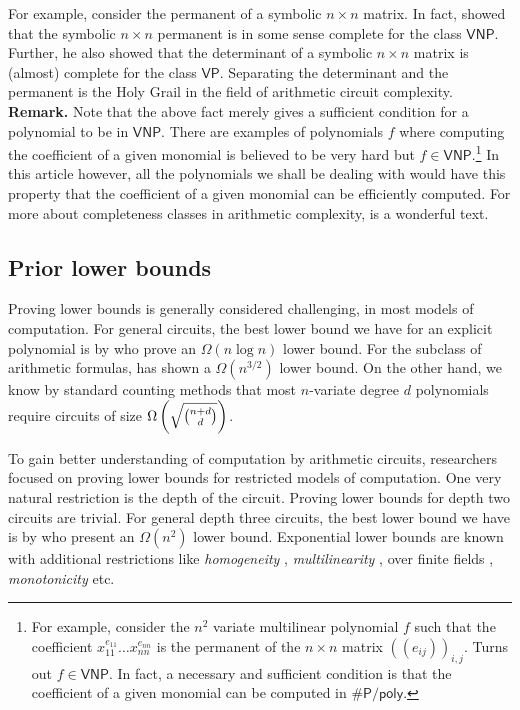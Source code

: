 \documentclass[12pt]{report}
\newcommand{\poly}{\mathsf{poly}}
\newcommand{\VP}{\mathsf{VP}}
\newcommand{\VNP}{\mathsf{VNP}}
\begin{document}
For example, consider the permanent of a symbolic $n\times n$ matrix. In fact, \cite{v79} showed that the symbolic $n\times n$ permanent is in some sense complete for the class $\VNP$. Further, he also showed that the determinant of a symbolic  $n\times n$ matrix is (almost) complete for the class $\VP$. Separating the determinant and the permanent is the Holy Grail in the field of arithmetic circuit complexity. \\

{\bf Remark.} Note that the above fact merely gives a sufficient condition for a polynomial to be in $\VNP$. There are examples of polynomials $f$ where computing the coefficient of a given monomial is believed to be very hard but $f\in \VNP$.\footnote{For example, consider the $n^2$ variate multilinear polynomial $f$ such that the coefficient $x_{11}^{e_{11}}\dots x_{nn}^{e_{nn}}$ is the permanent of the $n\times n$ matrix $(\!(e_{ij})\!)_{i,j}$. Turns out $f \in \VNP$. In fact, a necessary and sufficient condition is that the coefficient of a given monomial can be computed in $\#\mathsf{P}/\poly$. }  In this article however, all the polynomials we shall be dealing with would have this property that the coefficient of a given monomial can be efficiently computed. For more about completeness classes in arithmetic complexity, \cite{bcs97} is a wonderful text. 


\subsection{Prior lower bounds}

Proving lower bounds is generally considered challenging, in most models of computation. For general circuits, the best lower bound we have for an explicit polynomial is by \cite{BS83} who prove an $\Omega(n\log n)$ lower bound. For the subclass of arithmetic formulas, \cite{k85} has shown a $\Omega(n^{3/2})$ lower bound. On the other hand, we know by standard counting methods that most $n$-variate degree $d$ polynomials require circuits of size $\Omega\left(\sqrt{\binom{n+d}{d}}\right)$.

To gain better understanding of computation by arithmetic circuits, researchers focused on proving lower bounds for restricted models of computation. One very natural restriction is the depth of the circuit. Proving lower bounds for depth two circuits are trivial. For general depth three circuits, the best lower bound we have is by \cite{sw2001} who present an $\Omega(n^2)$ lower bound. Exponential lower bounds are known with additional restrictions like \emph{homogeneity} \cite{nw1997}, \emph{multilinearity} \cite{raz2004,raz-yehudayoff}, over finite fields \cite{gr00,grigoriev98}, \emph{monotonicity} \cite{js82} etc. 
\end{document}
